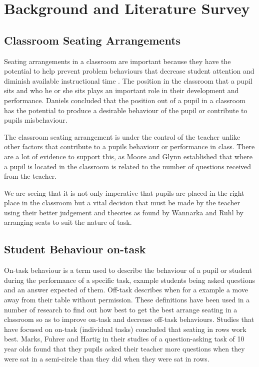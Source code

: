\section{Background and Literature Survey}
\subsection{Classroom Seating Arrangements}
Seating arrangements in a classroom are important because they have the potential to help prevent problem behaviours that decrease student attention and diminish available instructional time \cite{wannarka2008seating}. The position in the classroom that a pupil sits and who he or she sits plays an important role in their development and performance. Daniels \cite{daniels1998manage} concluded that the position out of a pupil in a classroom has the potential to produce a desirable behaviour of the pupil or contribute to pupils misbehaviour.

The classroom seating arrangement is under the control of the teacher unlike other factors that contribute to a pupils behaviour or performance in class. There are a lot of evidence to support this, as Moore and Glynn \cite{moore1984variation} established that where a pupil is located in the classroom is related to the number of questions received from the teacher.

We are seeing that it is not only imperative that pupils are placed in the right place in the classroom but a vital decision that must be made by the teacher using their better judgement and theories as found by Wannarka and Ruhl \cite{wannarka2008seating} by arranging seats to suit the nature of task.

\subsection{Student Behaviour on-task}
On-task behaviour is a term used to describe the behaviour of a pupil or student during the performance of a specific task, example students being asked questions and an answer expected of them. Off-task describes when for a example a move away from their table without permission. These definitions have been used in a number of research to find out how best to get the best arrange seating in a classroom so as to improve on-task and decrease off-task behaviours. Studies that have focused on on-task (individual tasks) concluded that seating in rows work best. Marks, Fuhrer and Hartig \cite{marx1999effects} in their studies of a question-asking task of 10 year olds found that they pupils asked their teacher more questions when they were sat in a semi-circle than they did when they were sat in rows.

